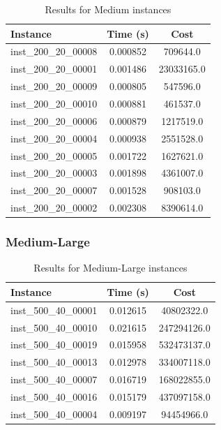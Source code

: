 \documentclass{article}
\begin{document}
\begin{table}[H]
\centering
\begin{tabular}{lcc}
\toprule
\textbf{Instance}         & \textbf{Time (s)} & \textbf{Cost} \\ 
\midrule
inst\_200\_20\_00008 & 0.000852 & 709644.0   \\ 
inst\_200\_20\_00001 & 0.001486 & 23033165.0 \\ 
inst\_200\_20\_00009 & 0.000805 & 547596.0   \\ 
inst\_200\_20\_00010 & 0.000881 & 461537.0   \\ 
inst\_200\_20\_00006 & 0.000879 & 1217519.0  \\ 
inst\_200\_20\_00004 & 0.000938 & 2551528.0  \\ 
inst\_200\_20\_00005 & 0.001722 & 1627621.0  \\ 
inst\_200\_20\_00003 & 0.001898 & 4361007.0  \\ 
inst\_200\_20\_00007 & 0.001528 & 908103.0   \\ 
inst\_200\_20\_00002 & 0.002308 & 8390614.0  \\ 
\bottomrule
\end{tabular}
\caption{Results for Medium instances}
\end{table}

\subsubsection*{Medium-Large}
\begin{table}[H]
\centering
\begin{tabular}{lcc}
\toprule
\textbf{Instance}         & \textbf{Time (s)} & \textbf{Cost} \\ 
\midrule
inst\_500\_40\_00001 & 0.012615 & 40802322.0  \\ 
inst\_500\_40\_00010 & 0.021615 & 247294126.0 \\ 
inst\_500\_40\_00019 & 0.015958 & 532473137.0 \\ 
inst\_500\_40\_00013 & 0.012978 & 334007118.0 \\ 
inst\_500\_40\_00007 & 0.016719 & 168022855.0 \\ 
inst\_500\_40\_00016 & 0.015179 & 437097158.0 \\ 
inst\_500\_40\_00004 & 0.009197 & 94454966.0  \\ 
\bottomrule
\end{tabular}
\caption{Results for Medium-Large instances}
\end{table}
\end{document}
